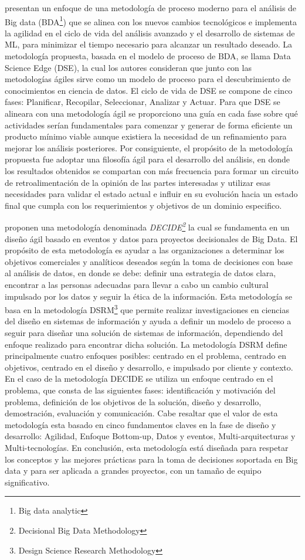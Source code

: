 \citep{Grady2017} presentan un enfoque de una metodología de proceso moderno para el análisis de Big data (BDA\footnote{Big data analytic}) que se alinea con los nuevos cambios tecnológicos e implementa la agilidad en el ciclo de vida del análisis avanzado y el desarrollo de sistemas de ML, para minimizar el tiempo necesario para alcanzar un resultado deseado. La metodología propuesta, basada en el modelo de proceso de BDA, se llama Data Science Edge (DSE), la cual los autores consideran que junto con las metodologías ágiles sirve como un modelo de proceso para el descubrimiento de conocimientos en ciencia de datos. El ciclo de vida de DSE se compone de cinco fases: Planificar, Recopilar, Seleccionar, Analizar y Actuar. Para que DSE se alineara con una metodología ágil se proporciono una guía en cada fase sobre qué actividades serían fundamentales para comenzar y generar de forma eficiente un producto mínimo viable aunque existiera la necesidad de un refinamiento para mejorar los análisis posteriores. Por consiguiente, el propósito de la metodología propuesta fue adoptar una filosofía ágil para el desarrollo del análisis, en donde los resultados obtenidos se compartan con más frecuencia para formar un circuito de retroalimentación de la opinión de las partes interesadas y utilizar esas necesidades para validar el estado actual e influir en su evolución hacia un estado final que cumpla con los requerimientos y objetivos de un dominio especifico.

\citep{Sfaxi2020} proponen una metodología denominada \textit{DECIDE\footnote{Decisional Big Data Methodology}} la cual se fundamenta en un diseño ágil basado en eventos y datos para proyectos decisionales de Big Data. El propósito de esta metodología es ayudar a las organizaciones a determinar los objetivos comerciales y analíticos deseados según la toma de decisiones con base al análisis de datos, en donde se debe: definir una estrategia de datos clara, encontrar a las personas adecuadas para llevar a cabo un cambio cultural impulsado por los datos y seguir la ética de la información. Esta metodología se basa en la  metodología DSRM\footnote{Design Science Research Methodology} que permite realizar investigaciones en ciencias del diseño en sistemas de información y ayuda a definir un modelo de proceso a seguir para diseñar una solución de sistemas de información, dependiendo del enfoque realizado para encontrar dicha solución. La metodología DSRM define principalmente cuatro enfoques posibles: centrado en el problema, centrado en objetivos, centrado en el diseño y desarrollo, e impulsado por cliente y contexto. En el caso de la metodología DECIDE se utiliza un enfoque centrado en el problema, que consta de las siguientes fases: identificación y motivación del problema, definición de los objetivos de la solución, diseño y desarrollo, demostración, evaluación y comunicación. Cabe resaltar que el valor de esta metodología esta basado en cinco fundamentos claves en la fase de diseño y desarrollo: Agilidad, Enfoque Bottom-up, Datos y eventos, Multi-arquitecturas y Multi-tecnologías. En conclusión, esta metodología está diseñada para respetar los conceptos y las mejores prácticas para la toma de decisiones soportada en Big data y para ser aplicada a grandes proyectos, con un tamaño de equipo significativo. 

